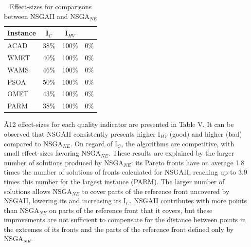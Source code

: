 \documentclass[conference]{IEEEtran}
\begin{document}
\begin{table}[htbp]
  \centering
  \caption{Effect-sizes for comparisons between NSGAII and NSGA$_{NE}$}
    \begin{tabular}{lccc}
    \toprule
    \textbf{Instance} & \textbf{I$_{C}$} & \textbf{I$_{HV}$} & \textbf{} \\
    \midrule
    ACAD  & 38\%  & 100\% & 0\% \\
    WMET  & 40\%  & 100\% & 0\% \\
    WAMS  & 46\%  & 100\% & 0\% \\
    PSOA  & 50\%  & 100\% & 0\% \\
    OMET  & 43\%  & 100\% & 0\% \\
    PARM  & 38\%  & 100\% & 0\% \\
    \bottomrule
    \end{tabular}%
\end{table}%


Â12 effect-sizes for each quality indicator are presented in Table V. It can be observed that NSGAII consistently presents higher I$_{HV}$ (good) and higher  (bad) compared to NSGA$_{NE}$. On regard of I$_{C}$, the algorithms are competitive, with small effect-sizes favoring NSGA$_{NE}$. These results are explained by the larger number of solutions produced by NSGA$_{NE}$: its Pareto fronts have on average 1.8 times the number of solutions of fronts calculated for NSGAII, reaching up to 3.9 times this number for the largest instance (PARM). The larger number of solutions allows NSGA$_{NE}$ to cover parts of the reference front uncovered by NSGAII, lowering its  and increasing its I$_{C}$. NSGAII contributes with more points than NSGA$_{NE}$ on parts of the reference front that it covers, but these improvements are not sufficient to compensate for the distance between points in the extremes of its fronts and the parts of the reference front defined only by NSGA$_{NE}$.
\end{document}
